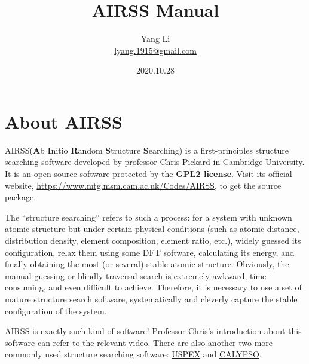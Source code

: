 \documentclass[a4paper, 10pt]{article}
\title{\textbf{AIRSS Manual}}
\author{Yang Li\\ \href{mailto:lyang.1915@gmail.com}{lyang.1915@gmail.com}}
\date{2020.10.28}
\begin{document}
\maketitle
\tableofcontents

\newpage
\section{About AIRSS}
AIRSS(\textbf{A}b \textbf{I}nitio \textbf{R}andom \textbf{S}tructure \textbf{S}earching) is a first-principles structure searching software developed by professor \href{https://www.mtg.msm.cam.ac.uk/People/CJP}{Chris Pickard} in Cambridge University. It is an open-source software protected by the \href{https://en.wikipedia.org/wiki/GNU_General_Public_License}{\textbf{GPL2 license}}. Visit its official website, \url{https://www.mtg.msm.cam.ac.uk/Codes/AIRSS}, to get the source package. 

The ``structure searching'' refers to such a process: for a system with unknown atomic structure but under certain physical conditions (such as atomic distance, distribution density, element composition, element ratio, etc.), widely guessed its configuration, relax them using some DFT software, calculating its energy, and finally obtaining the most (or several) stable atomic structure. Obviously, the manual guessing or blindly traversal search is extremely awkward, time-consuming, and even difficult to achieve. Therefore, it is necessary to use a set of mature structure search software, systematically and cleverly capture the stable configuration of the system.

AIRSS is exactly such kind of software! Professor Chris's introduction about this software can refer to the \href{https://www.youtube.com/watch?v=xW6pOYEIKVs&t=1061s}{relevant video}. There are also another two more commonly used structure searching software: \href{https://uspex-team.org/en/uspex/downloads}{USPEX} and \href{http://www.calypso.cn}{CALYPSO}.
\end{document}
